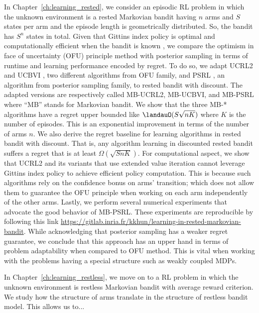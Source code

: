 In Chapter~\ref{ch:learning_rested}, we consider an episodic RL problem in which the unknown environment is a rested Markovian bandit having $n$ arms and $S$ states per arm and the episode length is geometrically distributed.
So, the bandit has $S^n$ states in total.
Given that Gittins index policy is optimal and computationally efficient when the bandit is known \cite{gittins1979bandit}, we compare the optimism in face of uncertainty (OFU) principle method with posterior sampling in terms of runtime and learning performance encoded by regret.
To do so, we adapt UCRL2 \cite{jaksch2010near} and UCBVI \cite{azar2017minimax}, two different algorithms from OFU family, and PSRL \cite{osband2013more}, an algorithm from posterior sampling family, to rested bandit with discount.
The adapted versions are respectively called MB-UCRL2, MB-UCBVI, and MB-PSRL where ``MB'' stands for Markovian bandit.
We show that the three MB-* algorithms have a regret upper bounded like $\landauO(S\sqrt{nK})$ where $K$ is the number of episodes.
This is an exponential improvement in terms of the number of arms $n$.
We also derive the regret baseline for learning algorithms in rested bandit with discount.
That is, any algorithm learning in discounted rested bandit suffers a regret that is at least $\Omega(\sqrt{SnK})$.
For computational aspect, we show that UCRL2 and its variants that use extended value iteration \cite{jaksch2010near} cannot leverage Gittins index policy to achieve efficient policy computation.
This is because such algorithms rely on the confidence bonus on arms' transition; which does not allow them to guarantee the OFU principle when working on each arm independently of the other arms.
Lastly, we perform several numerical experiments that advocate the good behavior of MB-PSRL.
These experiments are reproducible by following this link \url{https://gitlab.inria.fr/kkhun/learning-in-rested-markovian-bandit}.
While acknowledging that posterior sampling has a weaker regret guarantee, we conclude that this approach has an upper hand in terms of problem adaptability when compared to OFU method.
This is vital when working with the problems having a special structure such as weakly coupled MDPs.

In Chapter~\ref{ch:learning_restless}, we move on to a RL problem in which the unknown environment is restless Markovian bandit with average reward criterion.
We study how the structure of arms translate in the structure of restless bandit model.
This allows us to...


